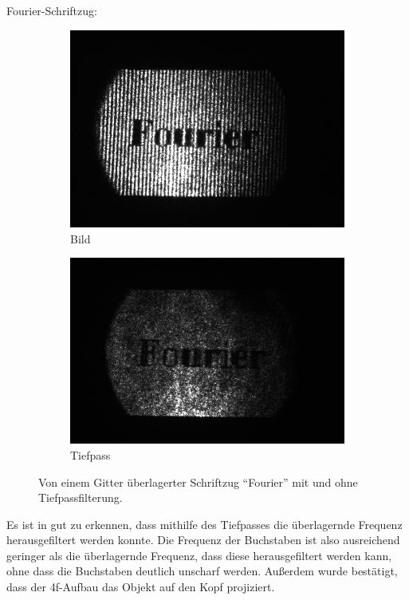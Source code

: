 \documentclass[
	a4paper,
	12pt,
	pagesize,
	ngerman
]{scrartcl}
\begin{document}
	Fourier-Schriftzug:
		\begin{figure}[H]
	        \centering
	        \begin{subfigure}[b]{0.400\textwidth}
	            \centering
	            \includegraphics[width=\textwidth]{raw/4/4_fourier_gitter}
	            \caption%
	            {Bild}
	            \label{fig_4_fourier_gitter}
	        \end{subfigure}
	        \hfill
	        \begin{subfigure}[b]{0.400\textwidth}
	            \centering
	            \includegraphics[width=\textwidth]{raw/4/4_fourier_tiefpass}
	            \caption[]%
	            {Tiefpass}
	            \label{fig_4_fourier_filter}
	        \end{subfigure}
	        \caption%
	        {
					Von einem Gitter überlagerter Schriftzug \enquote{Fourier} mit und ohne Tiefpassfilterung.
					}
	        \label{fig_4_fourier}
	    \end{figure}
	Es ist in  gut zu erkennen, dass mithilfe des Tiefpasses die überlagernde Frequenz herausgefiltert werden konnte.
	Die Frequenz der Buchstaben ist also ausreichend geringer als die überlagernde Frequenz, dass diese herausgefiltert werden kann, ohne dass die Buchstaben deutlich unscharf werden.
	Außerdem wurde bestätigt, dass der 4f-Aufbau das Objekt auf den Kopf projiziert.
\end{document}
